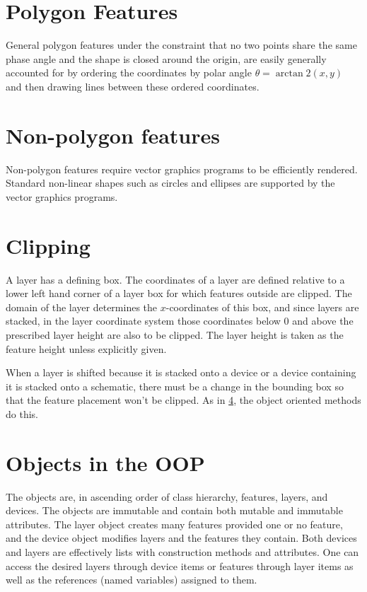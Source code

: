 \documentclass{article}
\begin{document}
\section{Polygon Features}
General polygon features under the constraint that no two points share the same phase angle and the shape is closed around the origin, are easily generally accounted for by ordering the coordinates by polar angle $\theta = \arctan2(x,y)$ and then drawing lines between these ordered coordinates.

\section{Non-polygon features}
Non-polygon features require vector graphics programs to be efficiently rendered. Standard non-linear shapes such as circles and ellipses are supported by the vector graphics programs. 

\section{Clipping}
A layer has a defining box. The coordinates of a layer are defined relative to a lower left hand corner of a layer box for which features outside are clipped. The domain of the layer determines the $x$-coordinates of this box, and since layers are stacked, in the layer coordinate system those coordinates below 0 and above the prescribed layer height are also to be clipped. The layer height is taken as the feature height unless explicitly given.

When a layer is shifted because it is stacked onto a device or a device containing it is stacked onto a schematic, there must be a change in the bounding box so that the feature placement won't be clipped. As in \ref{sec:oop}, the object oriented methods do this.

\section{Objects in the OOP}\label{sec:oop}
The objects are, in ascending order of class hierarchy, features, layers, and devices. The objects are immutable and contain both mutable and immutable attributes. The layer object creates many features provided one or no feature, and the device object modifies layers and the features they contain. Both devices and layers are effectively lists with construction methods and attributes. One can access the desired layers through device items or features through layer items as well as the references (named variables) assigned to them.
\end{document}
